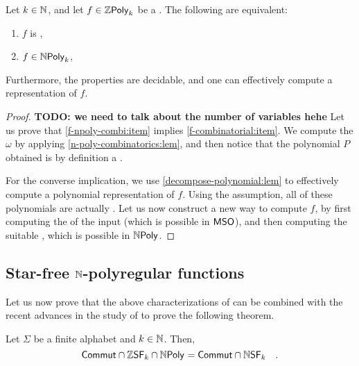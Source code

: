 \begin{theorem}
    \label{decidable-n-poly:thm}
    Let $k \in \mathbb{N}$, and 
    let $f \in \ZPoly[k]$ be a  .
    The following are equivalent:
    \begin{enumerate}
        \item \label{f-combinatorial:item} $f$ is ,
        \item \label{f-npoly-combi:item} $f \in \NPoly[k]$,
    \end{enumerate}
    Furthermore, the properties are decidable,
    and one can effectively compute a representation of $f$.
\end{theorem}
\begin{proof}
    \textbf{TODO: we need to talk about the number of variables hehe}
    Let us prove that
    \cref{f-npoly-combi:item}
    implies \cref{f-combinatorial:item}. 
    We compute the $\omega$ by applying 
    \cref{n-poly-combinatorics:lem}, and then
    notice that the polynomial $P$ obtained is
    by definition a .

    For the converse implication, we use \cref{decompose-polynomial:lem} to
    effectively compute a polynomial representation of $f$. Using the
    assumption, all of these polynomials are actually . Let us now construct a new way to compute $f$, by first
    computing the  of the input (which is possible in
    $\mathsf{MSO}$), and then computing the suitable ,
    which is possible in $\NPoly$.
\end{proof}

\subsection{Star-free $\mathbb{N}$-polyregular functions}
\label{star-free:sec}

Let us now prove that the above characterizations of 
 can be combined with the recent advances in
the study of  \cite{LOPEZ23b} to prove the
following theorem.

\begin{theorem}
    \label{zsf-npoly-nsf:thm}
    Let $\Sigma$ be a finite alphabet and $k \in \mathbb{N}$.
    Then,
    \begin{equation*}
        \ZCommut \cap \ZSF[k] \cap \NPoly
        = \ZCommut \cap \NSF[k]
        \quad .
    \end{equation*}
\end{theorem}

